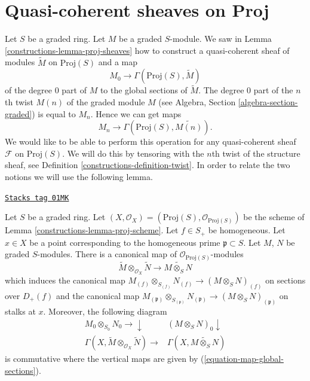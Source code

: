 \section{Quasi-coherent sheaves on Proj}
\label{constructions-section-quasi-coherent-proj}
Let $S$ be a graded ring. Let $M$ be a graded $S$-module.
We saw in Lemma \ref{constructions-lemma-proj-sheaves} how to construct a quasi-coherent
sheaf of modules $\widetilde{M}$ on $\text{Proj}(S)$ and a map
\begin{equation}
\label{equation-map-global-sections}
M_0 \longrightarrow \Gamma(\text{Proj}(S), \widetilde{M})
\end{equation}
of the degree $0$ part of $M$ to the global sections of $\widetilde{M}$.
The degree $0$ part of the $n$th twist $M(n)$ of the graded module $M$ (see
Algebra, Section \ref{algebra-section-graded})
is equal to $M_n$. Hence we can get maps
\begin{equation}
\label{equation-map-global-sections-degree-n}
M_n \longrightarrow \Gamma(\text{Proj}(S), \widetilde{M(n)}).
\end{equation}
We would like to be able to perform this operation for any quasi-coherent
sheaf $\mathcal{F}$ on $\text{Proj}(S)$. We will do this by tensoring
with the $n$th twist of the structure sheaf, see
Definition \ref{constructions-definition-twist}. In order to relate the two notions
we will use the following lemma.

\begin{lemma}
\label{constructions-lemma-widetilde-tensor}
\href{https://stacks.math.columbia.edu/tag/01MK}{\texttt{Stacks tag 01MK}}

Let $S$ be a graded ring.
Let $(X, \mathcal{O}_X) = (\text{Proj}(S), \mathcal{O}_{\text{Proj}(S)})$
be the scheme of Lemma \ref{constructions-lemma-proj-scheme}.
Let $f \in S_{+}$ be homogeneous. Let $x \in X$ be a point
corresponding to the homogeneous prime $\mathfrak p \subset S$.
Let $M$, $N$ be graded $S$-modules.
There is a canonical map of $\mathcal{O}_{\text{Proj}(S)}$-modules
$$
\widetilde M \otimes_{\mathcal{O}_X} \widetilde N
\longrightarrow
\widetilde{M \otimes_S N}
$$
which induces the canonical map
$
M_{(f)} \otimes_{S_{(f)}} N_{(f)}
\to
(M \otimes_S N)_{(f)}
$
on sections over $D_{+}(f)$ and the canonical map
$
M_{(\mathfrak p)} \otimes_{S_{(\mathfrak p)}} N_{(\mathfrak p)}
\to
(M \otimes_S N)_{(\mathfrak p)}
$
on stalks at $x$. Moreover, the following diagram
$$
\begin{array}{cc}M_0 \otimes_{S_0} N_0 \longrightarrow\downarrow & (M \otimes_S N)_0 \downarrow \\ \Gamma(X, \widetilde M \otimes_{\mathcal{O}_X} \widetilde N) \longrightarrow & \Gamma(X, \widetilde{M \otimes_S N})\end{array}
$$
is commutative where the vertical maps are given by
(\ref{equation-map-global-sections}).
\end{lemma}

